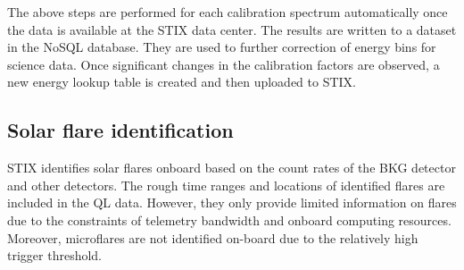 \documentclass[referee]{aa} %
\begin{document}
The above steps are performed for each calibration spectrum automatically once the data is available at the STIX data center. 
 The results are written to a dataset in the NoSQL database. 
 They are used to further correction of energy bins for science data.  
Once significant changes in the calibration factors are 
observed,  a new energy lookup table is created 
and then uploaded to STIX.


\subsection{Solar flare identification}

STIX identifies solar flares onboard based on the
 count rates of the BKG detector and other detectors.
The rough time ranges and locations of identified flares are included in the QL data.
However,  they only provide limited information on flares due to the constraints of telemetry 
bandwidth and onboard computing resources. Moreover, microflares are not identified on-board 
due to the relatively high trigger threshold.
\end{document}

